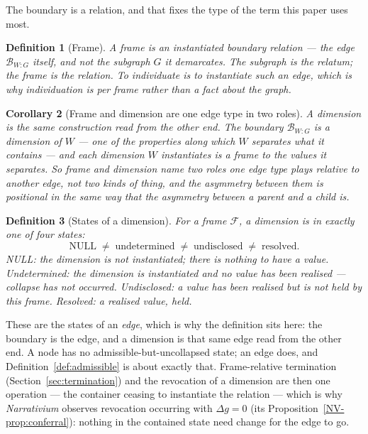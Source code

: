 \documentclass[11pt,a4paper]{article}
\newtheorem{definition}{Definition}[section]
\newtheorem{corollary}[definition]{Corollary}
\theoremstyle{remark}\newtheorem{remark}[definition]{Remark}
\begin{document}
The boundary is a relation, and that fixes the type of the term this paper uses most.

\begin{definition}[Frame]\label{def:frame}
A \emph{frame} is an instantiated boundary relation --- the edge $\mathcal B_{W:G}$ itself, and not the subgraph $G$ it demarcates. The subgraph is the relatum; the frame is the relation. To individuate is to instantiate such an edge, which is why individuation is per frame rather than a fact about the graph.
\end{definition}

\begin{corollary}[Frame and dimension are one edge type in two roles]\label{cor:frame-dimension}
A dimension is the same construction read from the other end. The boundary $\mathcal B_{W:G}$ is a dimension of $W$ --- one of the properties along which $W$ separates what it contains --- and each dimension $W$ instantiates is a frame to the values it separates. So \emph{frame} and \emph{dimension} name two roles one edge type plays relative to another edge, not two kinds of thing, and the asymmetry between them is positional in the same way that the asymmetry between a parent and a child is.
\end{corollary}
\begin{definition}[States of a dimension]\label{def:states}
For a frame $\mathcal F$, a dimension is in exactly one of four states:
\[
\boxed{\mathrm{NULL}\;\neq\;\mathrm{undetermined}\;\neq\;\mathrm{undisclosed}\;\neq\;\mathrm{resolved}.}
\]
\emph{NULL}: the dimension is not instantiated; there is nothing to have a value. \emph{Undetermined}: the dimension is instantiated and \emph{no value has been realised} --- collapse has not occurred. \emph{Undisclosed}: a value has been realised but is not held by this frame. \emph{Resolved}: a realised value, held.
\end{definition}
These are the states of an \emph{edge}, which is why the definition sits here: the boundary is the edge, and a dimension is that same edge read from the other end. A node has no admissible-but-uncollapsed state; an edge does, and Definition~\ref{def:admissible} is about exactly that. Frame-relative termination (Section~\ref{sec:termination}) and the revocation of a dimension are then one operation --- the container ceasing to instantiate the relation --- which is why \emph{Narrativium} observes revocation occurring with $\Delta g=0$ (its Proposition~\ref{NV-prop:conferral}): nothing in the contained state need change for the edge to go.
\end{document}
